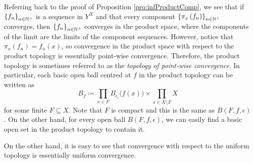 \documentclass[math]{amznotes}
\theoremstyle{remark}
\begin{document}
Referring back to the proof of Proposition \ref{pro:infProductComp}, we see that if $\left\{f_n\right\}_{n \in \mathbb{N}^+}$ is a sequence in $Y^X$ and that every component $\left\{\pi_x\left(f_n\right)\right\}_{n \in \mathbb{N}^+}$ converges, then $\left\{f_n\right\}_{n \in \mathbb{N}^+}$ converges in the product space, where the components of the limit are the limits of the component sequences. However, notice that $\pi_x\left(f_n\right) = f_n\left(x\right)$, so convergence in the product space with respect to the product topology is essentially point-wise convergence. Therefore, the product topology is sometimes referred to as the \textit{topology of point-wise convergence}. In particular, each basic open ball centred at $f$ in the product topology can be written as 
\begin{equation*}
    B_f \coloneqq \prod_{x \in F}B_{\epsilon_i}\bigl(f\left(x\right)\bigr) \times \prod_{x \in X \setminus F}X
\end{equation*}
for some finite $F \subseteq X$. Note that $F$ is compact and this is the same as $B\left(F, f, \epsilon\right)$. On the other hand, for every open ball $B\left(F, f, \epsilon\right)$, we can easily find a basic open set in the product topology to contain it.

On the other hand, it is easy to see that convergence with respect to the uniform topology is essentially uniform convergence.
\end{document}
